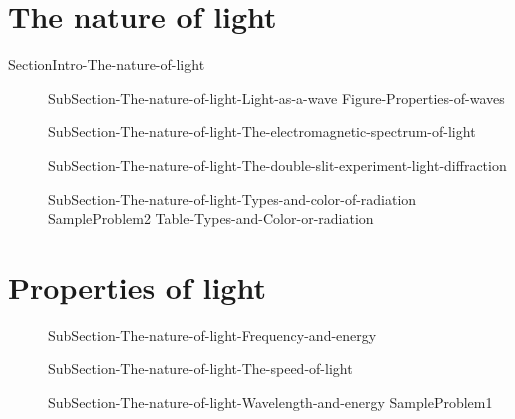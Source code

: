 \documentclass[main.tex]{subfiles}
\newcommand\chapterlabel{Ch-radiation}\setcounter{figurenewcounter}{0}\setcounter{tablenewcounter}{0}\setcounter{formulanewcounter}{0}\chapterpicture{../{\chapterlabel}/figure1}\chapterpicturelabel{PngImg}
\begin{document}
\section{The nature of light}{SectionIntro-The-nature-of-light}
\sloppy\begin{description}
\item[]{SubSection-The-nature-of-light-Light-as-a-wave}
{Figure-Properties-of-waves}
\item[]{SubSection-The-nature-of-light-The-electromagnetic-spectrum-of-light}
\vspace{-1cm}{Figure-Electromagnetic-field}
\item[] {SubSection-The-nature-of-light-The-double-slit-experiment-light-diffraction}
\vspace{-1cm}{Figure-Double-slit}
\vspace{0cm}\hspace{-5cm}{Figure-waves-and-life}
\vspace{1cm}{Figure-Electromagnetic-spectra}
\item[] {SubSection-The-nature-of-light-Types-and-color-of-radiation}
{SampleProblem2}
{Table-Types-and-Color-or-radiation}
\end{description}


\section{Properties of light} 
\sloppy\begin{description}
\item[] {SubSection-The-nature-of-light-Frequency-and-energy}
\item[] {SubSection-The-nature-of-light-The-speed-of-light}
\item[] {SubSection-The-nature-of-light-Wavelength-and-energy}
{SampleProblem1}
\end{description}
\end{document}
